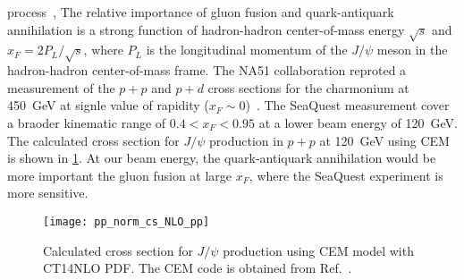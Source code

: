 \documentclass[../main.tex]{subfiles}
\begin{document}
process~\cite{vogt1999}, The relative importance of gluon fusion
and quark-antiquark annihilation is a strong function of hadron-hadron center-of-mass energy $\sqrt{s}$
and $x_F=2P_L/\sqrt{s}$, where $P_L$ is the longitudinal momentum of the $J/\psi$ meson in the
hadron-hadron center-of-mass frame.
The NA51 collaboration reproted a measurement of the $p+p$ and $p+d$ cross sections
for the charmonium at \SI{450}{\GeV} at signle value of rapidity ($x_F\sim 0$)~\cite{abreu1998}.
The SeaQuest measurement cover a braoder kinematic range of $0.4<x_F<0.95$ at a lower beam energy
of \SI{120}{\GeV}.
The calculated cross section for $J/\psi$ production in $p+p$ at \SI{120}{\GeV} using
CEM is shown in \cref{fig:cem_cs}.  
At our beam energy, the quark-antiquark annihilation would be more important the gluon fusion at large $x_F$, where
the SeaQuest experiment is more sensitive.
\begin{figure}[h!]
	\centering
	\texttt{[image: pp\_norm\_cs\_NLO\_pp]}
	\caption{Calculated cross section for $J/\psi$ production using CEM model with CT14NLO PDF.
		The CEM code is obtained from Ref.~\cite{mangano1993}.}
	\label{fig:cem_cs}
\end{figure}
\end{document}
